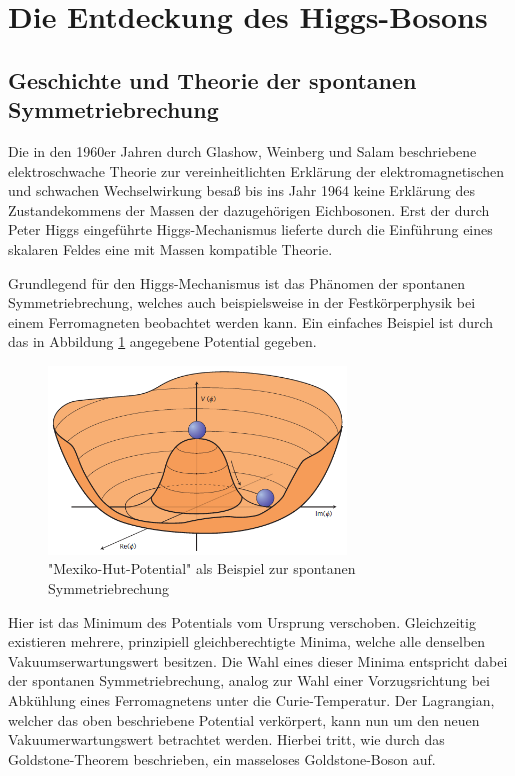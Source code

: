 
\section{Die Entdeckung des Higgs-Bosons}


\subsection{Geschichte und Theorie der spontanen Symmetriebrechung}
Die in den 1960er Jahren durch Glashow, Weinberg und Salam beschriebene elektroschwache Theorie zur vereinheitlichten Erklärung der elektromagnetischen und schwachen Wechselwirkung besaß bis ins Jahr 1964 keine Erklärung des Zustandekommens der Massen der dazugehörigen Eichbosonen.
Erst der durch Peter Higgs eingeführte Higgs-Mechanismus lieferte durch die Einführung eines skalaren Feldes eine mit Massen kompatible Theorie.

Grundlegend für den Higgs-Mechanismus ist das Phänomen der spontanen Symmetriebrechung, welches auch beispielsweise in der Festkörperphysik bei einem Ferromagneten beobachtet werden kann.
Ein einfaches Beispiel ist durch das in Abbildung \ref{fig:higgs} angegebene Potential gegeben.

\begin{figure}
  \centering
  \includegraphics[height=5.0cm]{ressources/higgspotential.png}
  \caption{"Mexiko-Hut-Potential" als Beispiel zur spontanen Symmetriebrechung \cite{Ellis:2012465}}
  \label{fig:higgs}
\end{figure}

Hier ist das Minimum des Potentials vom Ursprung verschoben.
Gleichzeitig existieren mehrere, prinzipiell gleichberechtigte Minima, welche alle denselben Vakuumserwartungswert besitzen.
Die Wahl eines dieser Minima entspricht dabei der spontanen Symmetriebrechung, analog zur Wahl einer Vorzugsrichtung bei Abkühlung eines Ferromagnetens unter die Curie-Temperatur.
Der Lagrangian, welcher das oben beschriebene Potential verkörpert, kann nun um den neuen Vakuumerwartungswert betrachtet werden.
Hierbei tritt, wie durch das Goldstone-Theorem beschrieben, ein masseloses Goldstone-Boson auf.

